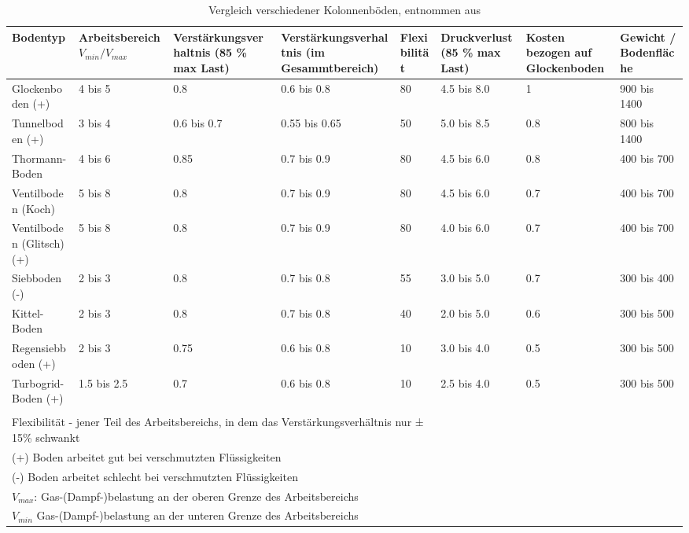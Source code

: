 \documentclass[12pt,a4paper,bibtotocnumbered,liststotocnumbered]{scrreprt}
\begin{document}
\begin{sidewaystable}[htbp]
  \centering
  \caption{Vergleich verschiedener Kolonnenböden, entnommen aus \cite{Schoenbucher2002}}
    \begin{tabular}{p{3cm}p{3cm}p{3.5cm}p{3.5cm}p{2cm}p{2.5cm}p{2.5cm}p{2.5cm}}
    \hline
    Bodentyp & Arbeitsbereich $V_{min}/V_{max}$ & Verstärkungsverhaltnis (85 \% max Last) & Verstärkungsverhaltnis (im Gesammtbereich) & Flexibilität & Druckverlust (85 \% max Last) & Kosten bezogen auf Glockenboden & Gewicht / Bodenfläche \\
    \hline
    Glockenboden (+)  & 4 bis 5  & 0.8  & 0.6 bis 0.8  & 80   & 4.5 bis 8.0  & 1    & 900 bis 1400 \\
    Tunnelboden (+)  & 3 bis 4  & 0.6 bis 0.7  & 0.55 bis 0.65  & 50   & 5.0 bis 8.5  & 0.8  & 800 bis 1400 \\
    Thormann-Boden  & 4 bis 6 & 0.85 & 0.7 bis 0.9  & 80   & 4.5 bis 6.0  & 0.8  & 400 bis 700 \\
    Ventilboden (Koch)  & 5 bis 8  & 0.8  & 0.7 bis 0.9  & 80   & 4.5 bis 6.0  & 0.7  & 400 bis 700 \\
    Ventilboden (Glitsch) (+)  & 5 bis 8  & 0.8  & 0.7 bis 0.9  & 80   & 4.0 bis 6.0  & 0.7  & 400 bis 700 \\
    Siebboden (-) & 2 bis 3  & 0.8  & 0.7 bis 0.8  & 55   & 3.0 bis 5.0 & 0.7  & 300 bis 400 \\
    Kittel-Boden & 2 bis 3  & 0.8  & 0.7 bis 0.8  & 40   & 2.0 bis 5.0  & 0.6  & 300 bis 500 \\
    Regensiebboden (+)  & 2 bis 3  & 0.75 & 0.6 bis 0.8  & 10   & 3.0 bis 4.0  & 0.5  & 300 bis 500 \\
    Turbogrid-Boden (+) & 1.5 bis 2.5  & 0.7  & 0.6 bis 0.8  & 10   & 2.5 bis 4.0  & 0.5  & 300 bis 500 \\
    \hline
    \\
    \multicolumn{5}{l}{Flexibilität - jener Teil des Arbeitsbereichs, in dem das Verstärkungsverhältnis nur ± 15\% schwankt}\\
 \multicolumn{5}{l}{(+) Boden arbeitet gut bei verschmutzten Flüssigkeiten}\\
 \multicolumn{5}{l}{(-) Boden arbeitet schlecht bei verschmutzten Flüssigkeiten}\\
 \multicolumn{5}{l}{$V_{max}$: Gas-(Dampf-)belastung an der oberen Grenze des Arbeitsbereichs}\\
 \multicolumn{5}{l}{ $V_{min}$ Gas-(Dampf-)belastung an der unteren Grenze des Arbeitsbereichs}\\
    \end{tabular}%
  \label{tab:vergleich}%
\end{sidewaystable}%
\end{document}
